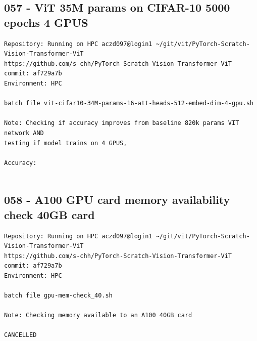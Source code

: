 \subsection{057 - ViT 35M params on CIFAR-10 5000 epochs 4 GPUS}
\label{app_res:057}
\begin{verbatim}
Repository: Running on HPC aczd097@login1 ~/git/vit/PyTorch-Scratch-Vision-Transformer-ViT
https://github.com/s-chh/PyTorch-Scratch-Vision-Transformer-ViT
commit: af729a7b
Environment: HPC

batch file vit-cifar10-34M-params-16-att-heads-512-embed-dim-4-gpu.sh

Note: Checking if accuracy improves from baseline 820k params VIT network AND
testing if model trains on 4 GPUS, 

Accuracy: 


\end{verbatim}

\subsection{058 - A100 GPU card memory availability check 40GB card}
\label{app_res:058}
\begin{verbatim}
Repository: Running on HPC aczd097@login1 ~/git/vit/PyTorch-Scratch-Vision-Transformer-ViT
https://github.com/s-chh/PyTorch-Scratch-Vision-Transformer-ViT
commit: af729a7b
Environment: HPC

batch file gpu-mem-check_40.sh

Note: Checking memory available to an A100 40GB card 

CANCELLED

\end{verbatim}

